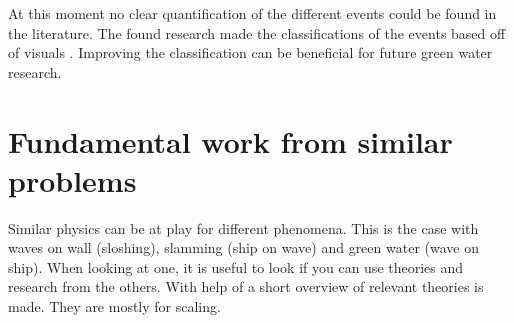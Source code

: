 \par 
At this moment no clear quantification of the different events could be found in the literature. The found research made the classifications of the events based off of visuals \cite{Greco2007, Chuang2019, Zhang2019}. Improving the classification can be beneficial for future green water research.





\section{Fundamental work from similar problems}
\label{sec:lit_relevant_theories}
Similar physics can be at play for different phenomena. This is the case with waves on wall (sloshing), slamming (ship on wave) and green water (wave on ship). When looking at one, it is useful to look if you can use theories and research from the others. With help of \cite{Dias2018} a short overview of relevant theories is made. They are mostly for scaling. 
\newline \par

